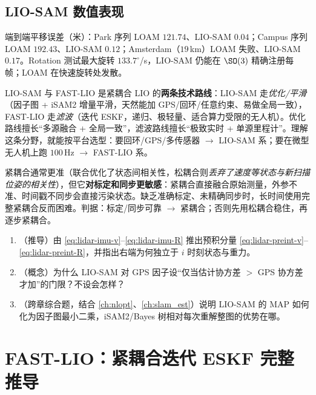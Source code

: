 \subsection{LIO-SAM 数值表现}
端到端平移误差（米）\cite{shan2020liosam}：Park 序列 LOAM $121.74$、LIO-SAM $0.04$；Campus 序列 LOAM $192.43$、LIO-SAM $0.12$；Amsterdam（$19$\,km）LOAM 失败、LIO-SAM $0.17$。Rotation 测试最大旋转 $133.7^\circ$/s，LIO-SAM 仍能在 $\SO(3)$ 精确注册每帧；LOAM 在快速旋转处发散。

\begin{insight}
LIO-SAM 与 FAST-LIO 是紧耦合 LIO 的\textbf{两条技术路线}：LIO-SAM 走\emph{优化/平滑}（因子图 + iSAM2 增量平滑，天然能加 GPS/回环/任意约束、易做全局一致），FAST-LIO 走\emph{滤波}（迭代 ESKF，递归、极轻量、适合算力受限的无人机）。优化路线擅长“多源融合 + 全局一致”，滤波路线擅长“极致实时 + 单源里程计”。理解这条分野，就能按平台选型：要回环/GPS/多传感器 $\to$ LIO-SAM 系；要在微型无人机上跑 $100$\,Hz $\to$ FAST-LIO 系。
\end{insight}

\begin{pitfall}
紧耦合通常更准（联合优化了状态间相关性，松耦合则\emph{丢弃了速度等状态与新扫描位姿的相关性}），但它\textbf{对标定和同步更敏感}：紧耦合直接融合原始测量，外参不准、时间戳不同步会直接污染状态。缺乏准确标定、未精确同步时，长时间使用完整紧耦合反而困难\cite{carlone2026handbook}。判据：标定/同步可靠 $\to$ 紧耦合；否则先用松耦合稳住，再逐步紧耦合。
\end{pitfall}

\begin{practice}
\begin{enumerate}
  \item （推导）由 \cref{eq:lidar-imu-v}–\cref{eq:lidar-imu-R} 推出预积分量 \cref{eq:lidar-preint-v}–\cref{eq:lidar-preint-R}，并指出右端为何独立于 $i$ 时刻状态与重力。
  \item （概念）为什么 LIO-SAM 对 GPS 因子设“仅当估计协方差 $>$ GPS 协方差才加”的门限？不设会怎样？
  \item （跨章综合题，结合 \cref{ch:nlopt}、\cref{ch:slam_est}）说明 LIO-SAM 的 MAP 如何化为因子图最小二乘，iSAM2/Bayes 树相对每次重解整图的优势在哪。
\end{enumerate}
\end{practice}

\section{FAST-LIO：紧耦合迭代 ESKF 完整推导}
\label{sec:lidar-fastlio}

